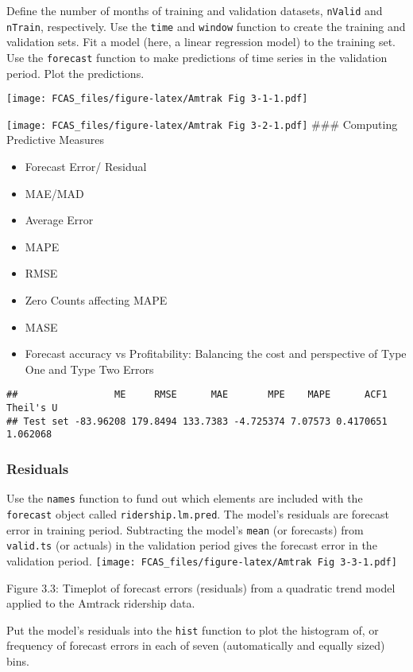 \documentclass[]{article}
\begin{document}
Define the number of months of training and validation datasets,
\texttt{nValid} and \texttt{nTrain}, respectively. Use the \texttt{time}
and \texttt{window} function to create the training and validation sets.
Fit a model (here, a linear regression model) to the training set. Use
the \texttt{forecast} function to make predictions of time series in the
validation period. Plot the predictions.

\texttt{[image: FCAS\_files/figure-latex/Amtrak Fig 3-1-1.pdf]}

\texttt{[image: FCAS\_files/figure-latex/Amtrak Fig 3-2-1.pdf]} \#\#\#
Computing Predictive Measures

\begin{itemize}
\item
  Forecast Error/ Residual
\item
  MAE/MAD
\item
  Average Error
\item
  MAPE
\item
  RMSE
\item
  Zero Counts affecting MAPE
\item
  MASE
\item
  Forecast accuracy vs Profitability: Balancing the cost and perspective
  of Type One and Type Two Errors
\end{itemize}

\begin{verbatim}
##                 ME     RMSE      MAE       MPE    MAPE      ACF1 Theil's U
## Test set -83.96208 179.8494 133.7383 -4.725374 7.07573 0.4170651  1.062068
\end{verbatim}

\subsubsection{Residuals}\label{residuals}

Use the \texttt{names} function to fund out which elements are included
with the \texttt{forecast} object called \texttt{ridership.lm.pred}. The
model's residuals are forecast error in training period. Subtracting the
model's \texttt{mean} (or forecasts) from \texttt{valid.ts} (or actuals)
in the validation period gives the forecast error in the validation
period. \texttt{[image: FCAS\_files/figure-latex/Amtrak Fig 3-3-1.pdf]}

Figure 3.3: Timeplot of forecast errors (residuals) from a quadratic
trend model applied to the Amtrack ridership data.

Put the model's residuals into the \texttt{hist} function to plot the
histogram of, or frequency of forecast errors in each of seven
(automatically and equally sized) bins.
\end{document}
